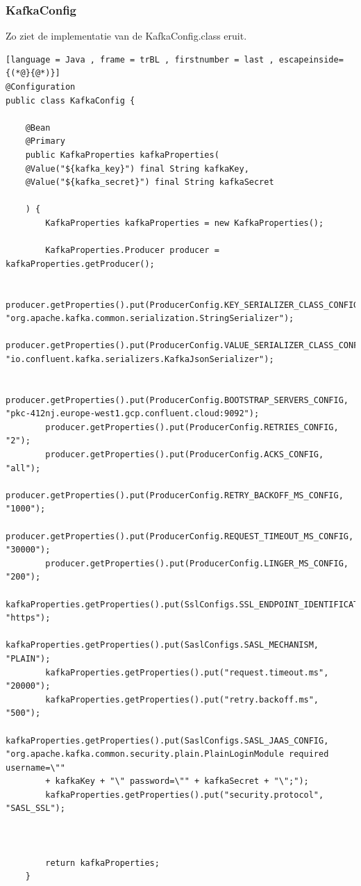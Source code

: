 \subsubsection{KafkaConfig}
Zo ziet de implementatie van de KafkaConfig.class eruit.
\begin{lstlisting}[language = Java , frame = trBL , firstnumber = last , escapeinside={(*@}{@*)}]
@Configuration
public class KafkaConfig {
    
    @Bean
    @Primary
    public KafkaProperties kafkaProperties(
    @Value("${kafka_key}") final String kafkaKey,
    @Value("${kafka_secret}") final String kafkaSecret
    
    ) {
        KafkaProperties kafkaProperties = new KafkaProperties();
       
        KafkaProperties.Producer producer = kafkaProperties.getProducer();
        
        producer.getProperties().put(ProducerConfig.KEY_SERIALIZER_CLASS_CONFIG, "org.apache.kafka.common.serialization.StringSerializer");
        producer.getProperties().put(ProducerConfig.VALUE_SERIALIZER_CLASS_CONFIG, "io.confluent.kafka.serializers.KafkaJsonSerializer");
        
        producer.getProperties().put(ProducerConfig.BOOTSTRAP_SERVERS_CONFIG, "pkc-412nj.europe-west1.gcp.confluent.cloud:9092");
        producer.getProperties().put(ProducerConfig.RETRIES_CONFIG, "2");
        producer.getProperties().put(ProducerConfig.ACKS_CONFIG, "all");
        producer.getProperties().put(ProducerConfig.RETRY_BACKOFF_MS_CONFIG, "1000");
        producer.getProperties().put(ProducerConfig.REQUEST_TIMEOUT_MS_CONFIG, "30000");
        producer.getProperties().put(ProducerConfig.LINGER_MS_CONFIG, "200");
        kafkaProperties.getProperties().put(SslConfigs.SSL_ENDPOINT_IDENTIFICATION_ALGORITHM_CONFIG, "https");
        kafkaProperties.getProperties().put(SaslConfigs.SASL_MECHANISM, "PLAIN");
        kafkaProperties.getProperties().put("request.timeout.ms", "20000");
        kafkaProperties.getProperties().put("retry.backoff.ms", "500");
        kafkaProperties.getProperties().put(SaslConfigs.SASL_JAAS_CONFIG, "org.apache.kafka.common.security.plain.PlainLoginModule required username=\""
        + kafkaKey + "\" password=\"" + kafkaSecret + "\";");
        kafkaProperties.getProperties().put("security.protocol", "SASL_SSL");
        
        
        
        return kafkaProperties;
    }
    \end{lstlisting}
    

